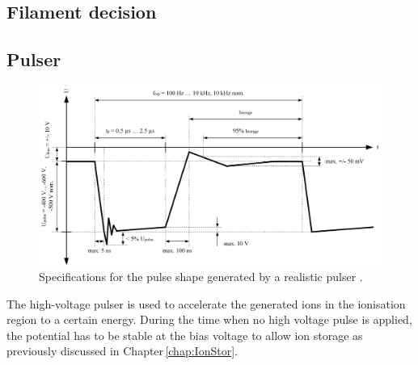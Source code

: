 	\subsection{Filament decision }


		\subsection{Pulser }
	\begin{figure}[h!]
		\centering
		\includegraphics[width=\textwidth]{Bilder/Pulser_theretical_shape.jpg}
		\caption{Specifications for the pulse shape generated by a realistic pulser \cite{Diss_Meyer}.}
		\label{fig:PulserTheoCurve}
	\end{figure}
	The high-voltage pulser is used to accelerate the generated ions in the ionisation region to a certain energy. During the time when no high voltage pulse is applied, the potential has to be stable at the bias voltage to allow ion storage as previously discussed in Chapter\,\ref{chap:IonStor}.\\
